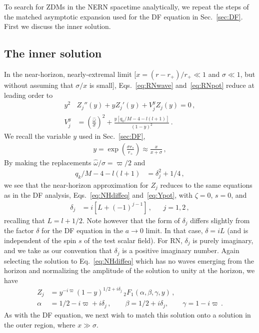 \begin{refsection}
To search for ZDMs in the NERN spacetime analytically, we repeat the steps of the matched asymptotic expansion used for the DF equation in Sec.~\ref{sec:DF}. First we discuss the inner solution.

\subsection{The inner solution}

In the near-horizon, nearly-extremal limit [$x = (r-r_+)/r_+\ll 1$ and $\sigma \ll 1$, but without assuming that $\sigma/x$ is small], Eqs.~\eqref{eq:RNwave} and~\eqref{eq:RNpot} reduce at leading order to 
\begin{align}
y^2 & Z_j''(y) + y Z_j'(y) + V^y_j Z_j (y)= 0\,, \\
V^y_j & = \left(\frac{\hat \omega}{\sigma}\right)^2 +\frac{y[q_k /M -4 - l(l+1)]}{(1-y)^2} \,.
\end{align}
We recall the variable $y$ used in Sec.~\ref{sec:DF}, 
\begin{align}
y = \exp \left( \frac{\sigma r_*} {r_+} \right) \approx \frac{x}{x+\sigma} \,,
\end{align}
By making the replacements $  \hat \omega/\sigma= \varpi / 2 $ and
\begin{align}
 q_k /M -4 - l(l+1) & = \delta_j^2 + 1/4 \,, 
 \end{align}
we see that the near-horizon approximation for $Z_j$ reduces to the same equations as in the DF analysis, Eqs.~\eqref{eq:NHdiffeq} and~\eqref{eq:Ypot}, with $\zeta = 0$, $s = 0$, and 
\begin{align}
\delta_j & = i \left [L + (-1)^{j-1} \right]\,, &&  j  = 1,2\,,
\end{align}
recalling that $L = l+ 1/2$.
Note however that the form of $\delta_j$ differs slightly from the factor $\delta$ for the DF equation in the $a \to 0$ limit. 
In that case, $\delta = i L$ (and is independent of the spin $s$ of the test scalar field). 
For RN, $\delta_j$ is purely imaginary, and we take as our convention that $\delta_j$ is a positive imaginary number.
Again selecting the solution to Eq.~\eqref{eq:NHdiffeq} which has no waves emerging from the horizon and normalizing the amplitude of the solution to unity at the horizon, we have
\begin{align}
\label{eq:RNnearsln}
Z_j & = y^{- i \varpi} (1 - y)^{1/2 + i \delta_j} \, {}_2 F_1\left(\alpha,\beta,\gamma, y \right) \,, \\
\alpha & = 1/2 - i \varpi + i \delta_j \,, \qquad \beta = 1/2 + i \delta_j, \qquad \gamma = 1 - i\varpi \,.
\end{align}
As with the DF equation, we next wish to match this solution onto a solution in the outer region, where $x \gg \sigma$.


\end{refsection}
